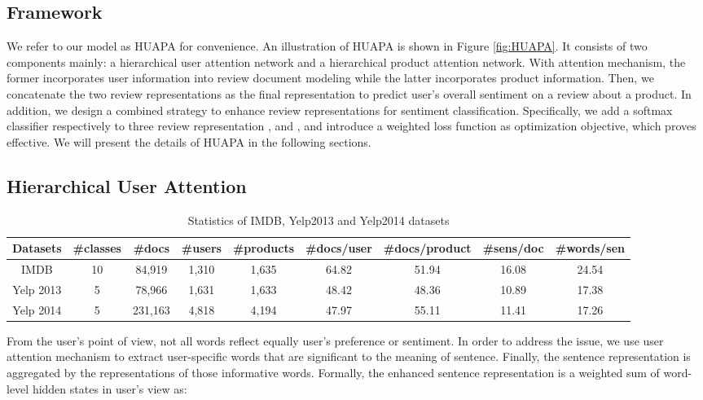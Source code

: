 \documentclass[letterpaper]{article} \usepackage{aaai18}  \usepackage{times}  \usepackage{helvet}  \usepackage{courier}  \usepackage{url}  \usepackage{graphicx}  \frenchspacing  \usepackage{amsmath}
\begin{document}
\subsection{Framework}
 We refer to our model as HUAPA for convenience. An illustration of HUAPA is shown in Figure \ref{fig:HUAPA}. It consists of two components mainly: a hierarchical user attention network and a hierarchical product attention network. With attention mechanism, the former incorporates user information into review document modeling while the latter incorporates product information. Then, we concatenate the two review representations as the final representation to predict user's overall sentiment on a review about a product. In addition, we design a combined strategy to enhance review representations for sentiment classification. Specifically,  we add a softmax classifier respectively to three review representation ,   and , and introduce a weighted loss function as optimization objective, which proves effective. We will present the details of HUAPA in the following sections.

\subsection{Hierarchical User Attention}
\begin{table*}[!htp]
\centering
\begin{tabular}{c|c|c|c|c|c|c|c|c}
\hline
Datasets  & \#classes & \#docs & \#users & \#products & \#docs/user & \#docs/product & \#sens/doc & \#words/sen  \\
\hline
IMDB  & 10 & 84,919 & 1,310 & 1,635 & 64.82 & 51.94 & 16.08 & 24.54 \\
Yelp 2013  & 5 & 78,966 & 1,631 & 1,633 & 48.42 & 48.36 & 10.89 & 17.38 \\
Yelp 2014  & 5 & 231,163 & 4,818 & 4,194 & 47.97 & 55.11 & 11.41 & 17.26 \\
\hline
\end{tabular}
\caption{Statistics of IMDB, Yelp2013 and Yelp2014 datasets}
\label{tab:statistics}
\end{table*}
From the user's point of view, not all words reflect equally user's preference or sentiment. In order to address the issue, we use user attention mechanism to extract user-specific words that are significant to the meaning of sentence. Finally, the sentence representation is aggregated by the representations of those informative words. Formally, the enhanced sentence representation  is a weighted sum of word-level hidden states in user's view as:
\end{document}
